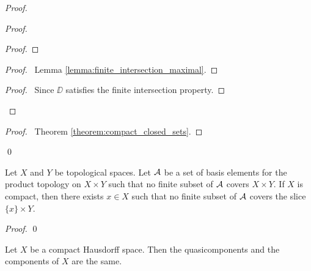 \begin{proof}
\begin{proof}
\begin{proof}
        \end{proof}
        \begin{proof}
            \pf\ Lemma \ref{lemma:finite_intersection_maximal}.
        \end{proof}
        \begin{proof}
            \pf\ Since $\DD$ satisfies the finite intersection property.
        \end{proof}
    \end{proof}
    \qedstep
    \begin{proof}
        \pf\ Theorem \ref{theorem:compact_closed_sets}.
    \end{proof}
    \qed
\end{proof}

\begin{lemma}
    \label{lemma:preTychonoff}
    Let $X$ and $Y$ be topological spaces.
    Let $\AA$ be a set of basis elements for the product topology on $X \times Y$ such that no finite subset of $\AA$ covers $X \times Y$.
    If $X$ is compact, then there exists $x \in X$ such that no finite subset of $\AA$ covers the slice $\{x\} \times Y$.
\end{lemma}

\begin{proof}
    \pf
    \qed
\end{proof}

\begin{theorem}[AC]
    Let $X$ be a compact Hausdorff space. Then the quasicomponents and the components of $X$ are the same.
\end{theorem}

